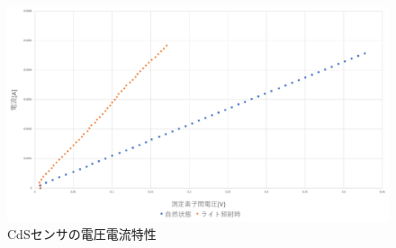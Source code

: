 \begin{figure}[h]
\centering
\includegraphics[scale=0.38]{./fig/3-3.pdf}
\caption{CdSセンサの電圧電流特性}
\label{fig:3-3}
\end{figure}

